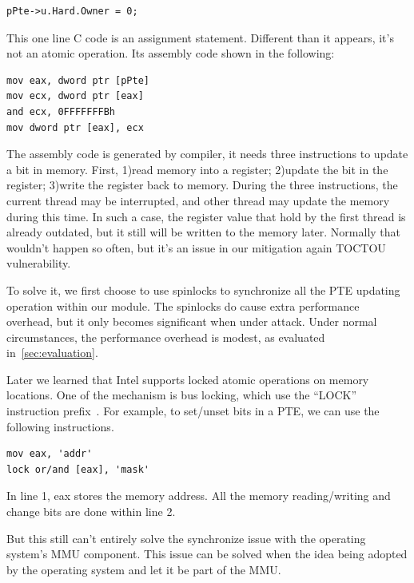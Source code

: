 \begin{lstlisting}[style=code] 
pPte->u.Hard.Owner = 0;
\end{lstlisting}

This one line C code is an assignment statement. Different than it appears, it's not an atomic operation. Its assembly code shown in the following:

\begin{lstlisting}[style=code] 
mov eax, dword ptr [pPte]
mov ecx, dword ptr [eax]
and ecx, 0FFFFFFFBh
mov dword ptr [eax], ecx
\end{lstlisting}

The assembly code is generated by compiler, it needs three instructions to update a bit in memory. First, 1)read memory into a register; 2)update the bit in the register; 3)write the register back to memory. During the three instructions, the current thread may be interrupted, and other thread may update the memory during this time. In such a case, the register value that hold by the first thread is already outdated, but it still will be written to the memory later. Normally that wouldn't happen so often, but it's an issue in our mitigation again TOCTOU vulnerability.

To solve it, we first choose to use spinlocks to synchronize all the PTE updating operation within our module. The spinlocks do cause extra performance overhead, but it only becomes significant when under attack. Under normal circumstances, the performance overhead is modest, as evaluated in~\autoref{sec:evaluation}.  

Later we learned that Intel supports locked atomic operations on memory locations. One of the mechanism is bus locking, which use the ``LOCK'' instruction prefix~\cite{intelmanualchapter8}. For example, to set/unset bits in a PTE, we can use the following instructions.

\begin{lstlisting}[style=code] 
mov eax, 'addr'
lock or/and [eax], 'mask'
\end{lstlisting}

In line 1, eax stores the memory address. All the memory reading/writing and change bits are done within line 2.

But this still can't entirely solve the synchronize issue with the operating system's MMU component. This issue can be solved when the idea being adopted by the operating system and let it be part of the MMU. 

